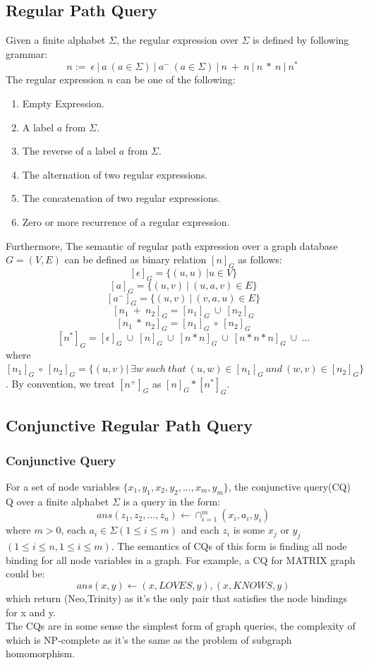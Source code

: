 \subsection{Regular Path Query}
Given a finite alphabet $\Sigma$, the regular expression over $\Sigma$ is defined by following grammar:
$$ n := \ \epsilon \ | \ a \ (a\in \Sigma) \ | \ a^- \ (a\in \Sigma) \ | \ n\ + \ n \ | \ n\ *\ n \ | \ n^* \  $$
The regular expression $n$ can be one of the following:
\begin{enumerate}
    \item Empty Expression.
    \item A label $a$ from $\Sigma$.
    \item The reverse of a label $a$ from $\Sigma$.
    \item The alternation of two regular expressions.
    \item The concatenation of two regular expressions.
    \item Zero or more recurrence of a regular expression.
\end{enumerate}
Furthermore, The semantic of regular path expression over a graph database $G=(V,E)$ can be defined as binary relation $[n]_G$ as follows:
$$[\epsilon]_G = \{(u,u) \ |u\in V\}$$
$$[a]_G = \{(u,v) \ |\ (u,a,v) \in E\}$$
$$[a^-]_G = \{ (u,v) \ |\ (v,a,u) \in E\}$$
$$[n_1\ +\ n_2]_G = [n_1]_G \ \cup \ [n_2]_G $$
$$[n_1\ *\ n_2]_G = [n_1]_G \ \circ \ [n_2]_G$$
$$[n^*]_G = [\epsilon]_G \ \cup \ [n]_G \ \cup \ [n*n]_G \ \cup \ [n*n*n]_G \ \cup \ ...   $$
where $[n_1]_G \ \circ \ [n_2]_G=\{ (u,v) | \ \exists w \ such \ that \ (u,w)\in [n_1]_G \ and \ (w,v) \in [n_2]_G \}$. By convention, we treat $[n^+]_G$ as $[n]_G*[n^*]_G.$
\subsection{Conjunctive Regular Path Query}
\subsubsection{Conjunctive Query}
For a set of node variables $\{ x_1,y_1,x_2,y_2,...,x_m,y_m \}$, the conjunctive query(CQ) Q over a finite alphabet $\Sigma$ is a query in the form:
$$ans(z_1,z_2,...,z_n) \leftarrow \cap_{i=1}^{m} (x_i,a_i,y_i)$$
where $m>0$, each $a_i \in \Sigma (1\leq i \leq m)$ and each $z_i$ is some $x_j$ or $y_j$ $(1\leq i \leq n,1\leq i \leq m)$. The semantics of CQs of this form is finding all node binding for all node variables in a graph. For example, a CQ for MATRIX graph could be:\\
$$ans(x,y)\leftarrow (x,LOVES,y),(x,KNOWS,y)$$
which return (Neo,Trinity) as it's the only pair that satisfies the node bindings for x and y.\\
The CQs are in some sense the simplest form of graph queries, the complexity of which is NP-complete as it's the same as the problem of subgraph homomorphism.
